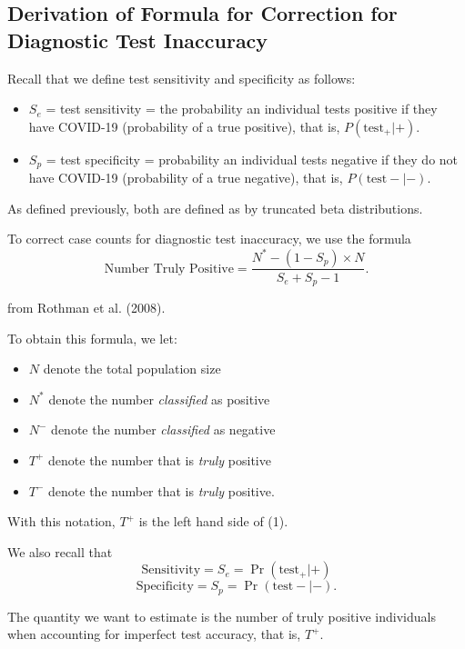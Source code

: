 \documentclass[12pt,twoside]{smiththesis}
\providecommand{\tightlist}{%
  \setlength{\itemsep}{0pt}\setlength{\parskip}{0pt}}
\begin{document}
\hypertarget{derivation-of-formula-for-correction-for-diagnostic-test-inaccuracy}{%
\subsection{Derivation of Formula for Correction for Diagnostic Test Inaccuracy}\label{derivation-of-formula-for-correction-for-diagnostic-test-inaccuracy}}

Recall that we define test sensitivity and specificity as follows:
\begin{itemize}
\tightlist
\item
  \(S_e\) = test sensitivity = the probability an individual tests positive if they have COVID-19 (probability of a true positive), that is, \(P(\text{test}_+ | +)\).
\item
  \(S_p\) = test specificity = probability an individual tests negative if they do not have COVID-19 (probability of a true negative), that is, \(P(\text{test}- |-)\).
\end{itemize}
As defined previously, both are defined as by truncated beta distributions.

To correct case counts for diagnostic test inaccuracy, we use the formula
\[\text{Number Truly Positive} = \dfrac{N^*- (1-S_p) \times N}{S_e+S_p-1}. \tag{1}\]

from Rothman et al. (2008).

\vspace{5 mm}

To obtain this formula, we let:
\begin{itemize}
\tightlist
\item
  \(N\) denote the total population size
\item
  \(N^*\) denote the number \emph{classified} as positive
\item
  \(N^-\) denote the number \emph{classified} as negative
\item
  \(T^+\) denote the number that is \emph{truly} positive
\item
  \(T^-\) denote the number that is \emph{truly} positive.
\end{itemize}
With this notation, \(T^+\) is the left hand side of (1).

We also recall that
\[ \text{Sensitivity} = S_e = \Pr(\text{test}_+ | +) \]
\[ \text{Specificity} = S_p = \Pr(\text{test}- | - ) .\]

\noindent The quantity we want to estimate is the number of truly positive individuals when accounting for imperfect test accuracy, that is, \(T^+\).
\end{document}

